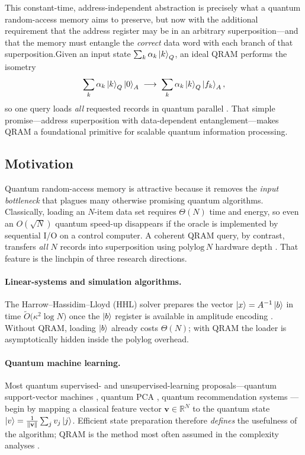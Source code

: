 \documentclass[11pt]{article}
\begin{document}
\vspace{0.3em}
\noindent
This constant-time, address-independent abstraction is precisely what
a quantum random-access memory aims to preserve, but now with the
additional requirement that the address register may be in an arbitrary
superposition—and that the memory must entangle the \emph{correct}
data word with each branch of that superposition.Given an input state $\sum_{k}\alpha_{k}\ket{k}_{Q}$, an ideal QRAM performs the isometry
\[
\sum_{k}\alpha_{k}\ket{k}_{Q}\ket{0}_{A}
\;\longrightarrow\;
\sum_{k}\alpha_{k}\ket{k}_{Q}\ket{f_{k}}_{A},
\]
so one query loads \emph{all} requested records in quantum parallel \cite{Giovannetti2008}. %
That simple promise—address superposition with data-dependent entanglement—makes QRAM a foundational primitive for scalable quantum information processing.


\subsection{Motivation}
Quantum random-access memory is attractive because it removes the
\textit{input bottleneck} that plagues many otherwise promising quantum
algorithms.
Classically, loading an $N$-item data set requires $\Theta(N)$ time and
energy, so even an $O(\sqrt{N})$ quantum speed-up disappears if the
oracle is implemented by sequential I/O on a control computer.
A coherent QRAM query, by contrast, transfers \emph{all} $N$ records
into superposition using $\mathrm{polylog}\,N$ hardware depth
\cite{Giovannetti2008,Phalak2023}.
That feature is the linchpin of three research directions.

\paragraph{Linear-systems and simulation algorithms.}
The Harrow–Hassidim–Lloyd (HHL) solver prepares the vector
$\ket{x}=A^{-1}\ket{b}$ in time
$\widetilde{O}\!\bigl(\kappa^{2}\log N\bigr)$ once the
$\ket{b}$ register is available in amplitude encoding
\cite{Harrow2009}.  
Without QRAM, loading $\ket{b}$ already costs $\Theta(N)$; with QRAM the
loader is asymptotically hidden inside the polylog overhead.

\paragraph{Quantum machine learning.}
Most quantum supervised- and unsupervised-learning proposals—quantum
support-vector machines \cite{Rebentrost2014},
quantum PCA \cite{Lloyd2014}, quantum recommendation systems
\cite{Kerenidis2016}
—begin by mapping a classical feature vector
$\mathbf{v}\in\mathbb{R}^{N}$ to the quantum state
$\ket{v}=\frac{1}{\lVert \mathbf{v}\rVert}\sum_{j} v_{j}\ket{j}$.
Efficient state preparation therefore \emph{defines} the usefulness of
the algorithm; QRAM is the method most often assumed in the complexity
analyses \cite{Schuld2019}.
\end{document}
